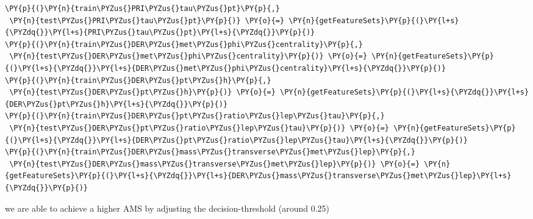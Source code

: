 {\par%
\vspace{-1\baselineskip}%
}%
\begin{notebookcell}[]%
\begin{addmargin}[\cellleftmargin]{0em}%
{\smaller%
\par%
%
\vspace{-1\smallerfontscale}%
\begin{Verbatim}[commandchars=\\\{\}]
\PY{p}{(}\PY{n}{train\PYZus{}PRI\PYZus{}tau\PYZus{}pt}\PY{p}{,}
 \PY{n}{test\PYZus{}PRI\PYZus{}tau\PYZus{}pt}\PY{p}{)} \PY{o}{=} \PY{n}{getFeatureSets}\PY{p}{(}\PY{l+s}{\PYZdq{}}\PY{l+s}{PRI\PYZus{}tau\PYZus{}pt}\PY{l+s}{\PYZdq{}}\PY{p}{)}
\PY{p}{(}\PY{n}{train\PYZus{}DER\PYZus{}met\PYZus{}phi\PYZus{}centrality}\PY{p}{,}
 \PY{n}{test\PYZus{}DER\PYZus{}met\PYZus{}phi\PYZus{}centrality}\PY{p}{)} \PY{o}{=} \PY{n}{getFeatureSets}\PY{p}{(}\PY{l+s}{\PYZdq{}}\PY{l+s}{DER\PYZus{}met\PYZus{}phi\PYZus{}centrality}\PY{l+s}{\PYZdq{}}\PY{p}{)}
\PY{p}{(}\PY{n}{train\PYZus{}DER\PYZus{}pt\PYZus{}h}\PY{p}{,}
 \PY{n}{test\PYZus{}DER\PYZus{}pt\PYZus{}h}\PY{p}{)} \PY{o}{=} \PY{n}{getFeatureSets}\PY{p}{(}\PY{l+s}{\PYZdq{}}\PY{l+s}{DER\PYZus{}pt\PYZus{}h}\PY{l+s}{\PYZdq{}}\PY{p}{)}
\PY{p}{(}\PY{n}{train\PYZus{}DER\PYZus{}pt\PYZus{}ratio\PYZus{}lep\PYZus{}tau}\PY{p}{,}
 \PY{n}{test\PYZus{}DER\PYZus{}pt\PYZus{}ratio\PYZus{}lep\PYZus{}tau}\PY{p}{)} \PY{o}{=} \PY{n}{getFeatureSets}\PY{p}{(}\PY{l+s}{\PYZdq{}}\PY{l+s}{DER\PYZus{}pt\PYZus{}ratio\PYZus{}lep\PYZus{}tau}\PY{l+s}{\PYZdq{}}\PY{p}{)}
\PY{p}{(}\PY{n}{train\PYZus{}DER\PYZus{}mass\PYZus{}transverse\PYZus{}met\PYZus{}lep}\PY{p}{,}
 \PY{n}{test\PYZus{}DER\PYZus{}mass\PYZus{}transverse\PYZus{}met\PYZus{}lep}\PY{p}{)} \PY{o}{=} \PY{n}{getFeatureSets}\PY{p}{(}\PY{l+s}{\PYZdq{}}\PY{l+s}{DER\PYZus{}mass\PYZus{}transverse\PYZus{}met\PYZus{}lep}\PY{l+s}{\PYZdq{}}\PY{p}{)}
\end{Verbatim}
%
\par%
\vspace{-1\smallerfontscale}}%
\end{addmargin}
\end{notebookcell}


    we are able to achieve a higher AMS by adjusting the decision-threshold
(around 0.25)



